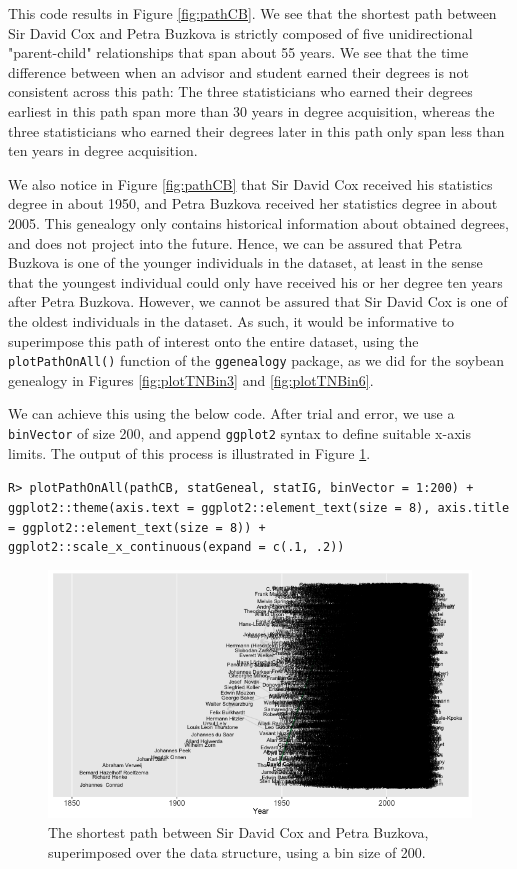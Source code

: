 \documentclass[11pt,a4paper,oldfontcommands,openany]{memoir}
\DeclareRobustCommand{\mybox}[2][gray!15]{%
\begin{tcolorbox}[   %
        breakable,
        left=0pt,
        right=0pt,
        top=0pt,
        bottom=0pt,
        colback=#1,
        colframe=#1,
        width=\dimexpr\textwidth\relax, 
        enlarge left by=0mm,
        boxsep=5pt,
        arc=0pt,outer arc=0pt,
        ]
        #2
\end{tcolorbox}
}
\numberwithin{equation}{section} %
\newcommand{\code}[1]{{\texttt{#1}}}
\newcommand{\pkg}[1]{{\texttt{#1}}}
\begin{document}
This code results in Figure \ref{fig:pathCB}. We see that the shortest path between Sir David Cox and Petra Buzkova is strictly composed of five unidirectional "parent-child" relationships that span about 55 years. We see that the time difference between when an advisor and student earned their degrees is not consistent across this path: The three statisticians who earned their degrees earliest in this path span more than 30 years in degree acquisition, whereas the three statisticians who earned their degrees later in this path only span less than ten years in degree acquisition.

We also notice in Figure \ref{fig:pathCB} that Sir David Cox received his statistics degree in about 1950, and Petra Buzkova received her statistics degree in about 2005. This genealogy only contains historical information about obtained degrees, and does not project into the future. Hence, we can be assured that Petra Buzkova is one of the younger individuals in the dataset, at least in the sense that the youngest individual could only have received his or her degree ten years after Petra Buzkova. However, we cannot be assured that Sir David Cox is one of the oldest individuals in the dataset. As such, it would be informative to superimpose this path of interest onto the entire dataset, using the \code{plotPathOnAll()} function of the \pkg{ggenealogy} package, as we did for the soybean genealogy in Figures \ref{fig:plotTNBin3} and \ref{fig:plotTNBin6}.

We can achieve this using the below code. After trial and error, we use a \code{binVector} of size 200, and append \pkg{ggplot2} syntax to define suitable x-axis limits. The output of this process is illustrated in Figure \ref{fig:plotCBText}.

\mybox{
\texttt{R> plotPathOnAll(pathCB, statGeneal, statIG, binVector = 1:200) + ggplot2::theme(axis.text = ggplot2::element\_text(size = 8), axis.title = ggplot2::element\_text(size = 8)) + ggplot2::scale\_x\_continuous(expand = c(.1, .2))}
}

\begin{figure}[H]
    \begin{framed}
    \centering
    \includegraphics[width=\textwidth]{plotCBText}
    \end{framed}
    \caption{The shortest path between Sir David Cox and Petra Buzkova, superimposed over the data structure, using a bin size of 200.}
    \label{fig:plotCBText}
\end{figure}
\end{document}
